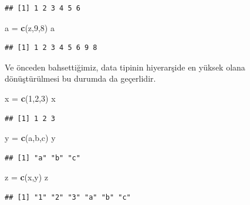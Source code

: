 \documentclass[
]{book}
\newenvironment{Shaded}{\begin{snugshade}}{\end{snugshade}}
\newcommand{\DecValTok}[1]{\textcolor[rgb]{0.00,0.00,0.81}{#1}}
\newcommand{\KeywordTok}[1]{\textcolor[rgb]{0.13,0.29,0.53}{\textbf{#1}}}
\newcommand{\NormalTok}[1]{#1}
\newcommand{\StringTok}[1]{\textcolor[rgb]{0.31,0.60,0.02}{#1}}
\begin{document}
\begin{verbatim}
## [1] 1 2 3 4 5 6
\end{verbatim}

\begin{Shaded}
\begin{Highlighting}[]
\NormalTok{a =}\StringTok{ }\KeywordTok{c}\NormalTok{(z,}\DecValTok{9}\NormalTok{,}\DecValTok{8}\NormalTok{)}
\NormalTok{a}
\end{Highlighting}
\end{Shaded}

\begin{verbatim}
## [1] 1 2 3 4 5 6 9 8
\end{verbatim}

Ve önceden bahsettiğimiz, data tipinin hiyerarşide en yüksek olana dönüştürülmesi bu durumda da geçerlidir.

\begin{Shaded}
\begin{Highlighting}[]
\NormalTok{x =}\StringTok{ }\KeywordTok{c}\NormalTok{(}\DecValTok{1}\NormalTok{,}\DecValTok{2}\NormalTok{,}\DecValTok{3}\NormalTok{)}
\NormalTok{x}
\end{Highlighting}
\end{Shaded}

\begin{verbatim}
## [1] 1 2 3
\end{verbatim}

\begin{Shaded}
\begin{Highlighting}[]
\NormalTok{y =}\StringTok{ }\KeywordTok{c}\NormalTok{(}\StringTok{\textquotesingle{}a\textquotesingle{}}\NormalTok{,}\StringTok{\textquotesingle{}b\textquotesingle{}}\NormalTok{,}\StringTok{\textquotesingle{}c\textquotesingle{}}\NormalTok{)}
\NormalTok{y}
\end{Highlighting}
\end{Shaded}

\begin{verbatim}
## [1] "a" "b" "c"
\end{verbatim}

\begin{Shaded}
\begin{Highlighting}[]
\NormalTok{z =}\StringTok{ }\KeywordTok{c}\NormalTok{(x,y)}
\NormalTok{z}
\end{Highlighting}
\end{Shaded}

\begin{verbatim}
## [1] "1" "2" "3" "a" "b" "c"
\end{verbatim}
\end{document}
